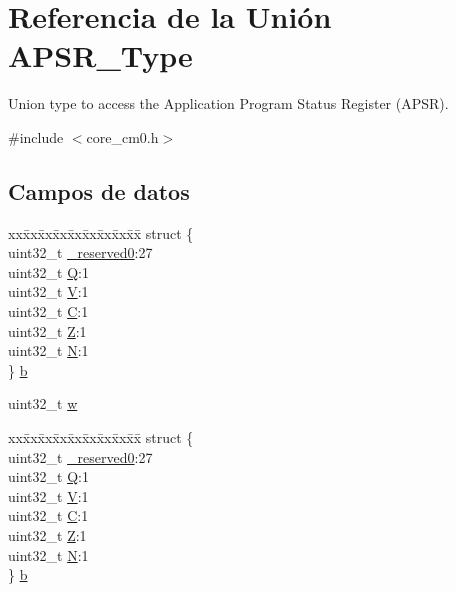 \hypertarget{union_a_p_s_r___type}{}\section{Referencia de la Unión A\+P\+S\+R\+\_\+\+Type}
\label{union_a_p_s_r___type}


Union type to access the Application Program Status Register (A\+P\+SR).  




{\ttfamily \#include $<$core\+\_\+cm0.\+h$>$}

\subsection*{Campos de datos}
\begin{DoxyCompactItemize}
\item 
\begin{tabbing}
xx\=xx\=xx\=xx\=xx\=xx\=xx\=xx\=xx\=\kill
struct \{\\
\>uint32\_t \hyperlink{union_a_p_s_r___type_ac8a6a13838a897c8d0b8bc991bbaf7c1}{\_reserved0}:27\\
\>uint32\_t \hyperlink{union_a_p_s_r___type_a65f27ddc4f7e09c14ce7c5211b2e000a}{Q}:1\\
\>uint32\_t \hyperlink{union_a_p_s_r___type_acd4a2b64faee91e4a9eef300667fa222}{V}:1\\
\>uint32\_t \hyperlink{union_a_p_s_r___type_a7a1caf92f32fe9ebd8d1fe89b06c7776}{C}:1\\
\>uint32\_t \hyperlink{union_a_p_s_r___type_a5ae954cbd9986cd64625d7fa00943c8e}{Z}:1\\
\>uint32\_t \hyperlink{union_a_p_s_r___type_abae0610bc2a97bbf7f689e953e0b451f}{N}:1\\
\} \hyperlink{union_a_p_s_r___type_a2e5b85cff450c7f92c7388dd09f10065}{b}\\

\end{tabbing}\item 
uint32\+\_\+t \hyperlink{union_a_p_s_r___type_ad0fb62e7a08e70fc5e0a76b67809f84b}{w}
\item 
\begin{tabbing}
xx\=xx\=xx\=xx\=xx\=xx\=xx\=xx\=xx\=\kill
struct \{\\
\>uint32\_t \hyperlink{union_a_p_s_r___type_ac8a6a13838a897c8d0b8bc991bbaf7c1}{\_reserved0}:27\\
\>uint32\_t \hyperlink{union_a_p_s_r___type_a65f27ddc4f7e09c14ce7c5211b2e000a}{Q}:1\\
\>uint32\_t \hyperlink{union_a_p_s_r___type_acd4a2b64faee91e4a9eef300667fa222}{V}:1\\
\>uint32\_t \hyperlink{union_a_p_s_r___type_a7a1caf92f32fe9ebd8d1fe89b06c7776}{C}:1\\
\>uint32\_t \hyperlink{union_a_p_s_r___type_a5ae954cbd9986cd64625d7fa00943c8e}{Z}:1\\
\>uint32\_t \hyperlink{union_a_p_s_r___type_abae0610bc2a97bbf7f689e953e0b451f}{N}:1\\
\} \hyperlink{union_a_p_s_r___type_a398a87eafed8dea4e666d03278e69b74}{b}\\


\end{tabbing}
\end{DoxyCompactItemize}
